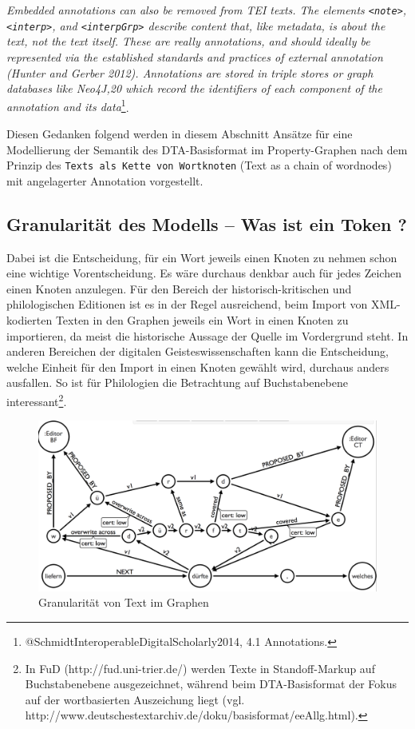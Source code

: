 \emph{Embedded annotations can also be removed from TEI texts. The
elements \texttt{\textless{}note\textgreater{}},
\texttt{\textless{}interp\textgreater{}}, and
\texttt{\textless{}interpGrp\textgreater{}} describe content that, like
metadata, is about the text, not the text itself. These are really
annotations, and should ideally be represented via the established
standards and practices of external annotation (Hunter and Gerber 2012).
Annotations are stored in triple stores or graph databases like Neo4J,20
which record the identifiers of each component of the annotation and its
data}\footnote{@SchmidtInteroperableDigitalScholarly2014, 4.1
  Annotations.}.

Diesen Gedanken folgend werden in diesem Abschnitt Ansätze für eine
Modellierung der Semantik des DTA-Basisformat im Property-Graphen nach
dem Prinzip des \texttt{Texts\ als\ Kette\ von\ Wortknoten} (Text as a
chain of wordnodes) mit angelagerter Annotation vorgestellt.

\hypertarget{granularituxe4t-des-modells-was-ist-ein-token}{%
\subsection{Granularität des Modells -- Was ist ein Token
?}\label{granularituxe4t-des-modells-was-ist-ein-token}}

Dabei ist die Entscheidung, für ein Wort jeweils einen Knoten zu nehmen
schon eine wichtige Vorentscheidung. Es wäre durchaus denkbar auch für
jedes Zeichen einen Knoten anzulegen. Für den Bereich der
historisch-kritischen und philologischen Editionen ist es in der Regel
ausreichend, beim Import von XML-kodierten Texten in den Graphen jeweils
ein Wort in einen Knoten zu importieren, da meist die historische
Aussage der Quelle im Vordergrund steht. In anderen Bereichen der
digitalen Geisteswissenschaften kann die Entscheidung, welche Einheit
für den Import in einen Knoten gewählt wird, durchaus anders ausfallen.
So ist für Philologien die Betrachtung auf Buchstabenebene
interessant\footnote{In FuD (http://fud.uni-trier.de/) werden Texte in
  Standoff-Markup auf Buchstabenebene ausgezeichnet, während beim
  DTA-Basisformat der Fokus auf der wortbasierten Auszeichung liegt
  (vgl. http://www.deutschestextarchiv.de/doku/basisformat/eeAllg.html).}.

\begin{figure}
\hypertarget{fig:Granularitaet-im-Graphen.png}{%
\centering
\includegraphics{Bilder/Granularitaet-im-Graphen.png}
\caption{Granularität von Text im
Graphen}\label{fig:Granularitaet-im-Graphen.png}
}
\end{figure}

